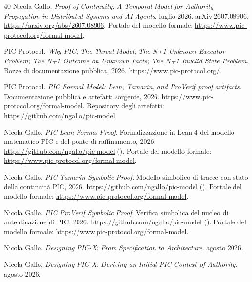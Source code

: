 \documentclass[10pt,oneside,openany]{book}
\begin{document}
\clearpage
\renewcommand{\bibname}{Riferimenti bibliografici}
\begin{thebibliography}{40}
Nicola Gallo.
\newblock \emph{Proof-of-Continuity: A Temporal Model for Authority Propagation in Distributed Systems and AI Agents}.
 luglio 2026. arXiv:2607.08906. \url{https://arxiv.org/abs/2607.08906}. Portale del modello formale: \url{https://www.pic-protocol.org/formal-model}.

PIC Protocol.
\newblock \emph{Why PIC; The Threat Model; The N+1 Unknown Executor Problem; The N+1 Outcome on Unknown Facts; The N+1 Invalid State Problem}.
\newblock Bozze di documentazione pubblica, 2026. \url{https://www.pic-protocol.org/}.

PIC Protocol.
\newblock \emph{PIC Formal Model: Lean, Tamarin, and ProVerif proof artifacts}.
\newblock Documentazione pubblica e artefatti sorgente, 2026. \url{https://www.pic-protocol.org/formal-model}. Repository degli artefatti: \url{https://github.com/ngallo/pic-model}.

Nicola Gallo.
\newblock \emph{PIC Lean Formal Proof}.
\newblock Formalizzazione in Lean 4 del modello matematico PIC e del ponte di raffinamento, 2026. \url{https://github.com/ngallo/pic-model} (). Portale del modello formale: \url{https://www.pic-protocol.org/formal-model}.

Nicola Gallo.
\newblock \emph{PIC Tamarin Symbolic Proof}.
\newblock Modello simbolico di tracce con stato della continuità PIC, 2026. \url{https://github.com/ngallo/pic-model} (). Portale del modello formale: \url{https://www.pic-protocol.org/formal-model}.

Nicola Gallo.
\newblock \emph{PIC ProVerif Symbolic Proof}.
\newblock Verifica simbolica del nucleo di autenticazione di PIC, 2026. \url{https://github.com/ngallo/pic-model} (). Portale del modello formale: \url{https://www.pic-protocol.org/formal-model}.

Nicola Gallo.
\newblock \emph{Designing PIC-X: From Specification to Architecture}.
 agosto 2026.

Nicola Gallo.
\newblock \emph{Designing PIC-X: Deriving an Initial PIC Context of Authority}.
 agosto 2026.


\end{thebibliography}
\end{document}

